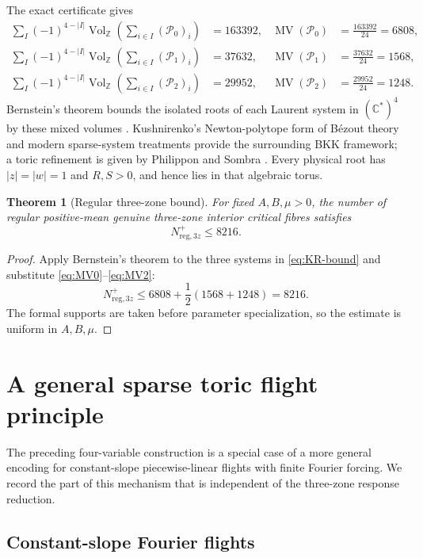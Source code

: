 \documentclass[11pt]{article}
\newtheorem{theorem}{Theorem}[section]
\newcommand{\CC}{\mathbb C}
\newcommand{\MV}{\operatorname{MV}}
\begin{document}
The exact certificate gives
\begin{align}
 \sum_I(-1)^{4-|I|}\operatorname{Vol}_{\mathbb Z}
 \left(\sum_{i\in I}(\mathcal P_0)_i\right)&=163392,
 &\MV(\mathcal P_0)&=\frac{163392}{24}=6808,\label{eq:MV0}\\
 \sum_I(-1)^{4-|I|}\operatorname{Vol}_{\mathbb Z}
 \left(\sum_{i\in I}(\mathcal P_1)_i\right)&=37632,
 &\MV(\mathcal P_1)&=\frac{37632}{24}=1568,\label{eq:MV1}\\
 \sum_I(-1)^{4-|I|}\operatorname{Vol}_{\mathbb Z}
 \left(\sum_{i\in I}(\mathcal P_2)_i\right)&=29952,
 &\MV(\mathcal P_2)&=\frac{29952}{24}=1248.\label{eq:MV2}
\end{align}
Bernstein's theorem bounds the isolated roots of each Laurent system in $(\CC^*)^4$ by these mixed volumes \cite{Bernstein1975}.  Kushnirenko's Newton-polytope form of B\'ezout theory \cite{Kushnirenko1976} and modern sparse-system treatments \cite{Sturmfels2002} provide the surrounding BKK framework; a toric refinement is given by Philippon and Sombra \cite{PhilipponSombra2008}.  Every physical root has $|z|=|w|=1$ and $R,S>0$, and hence lies in that algebraic torus.

\begin{theorem}[Regular three-zone bound]\label{thm:8216}
For fixed $A,B,\mu>0$, the number of regular positive-mean genuine three-zone interior critical fibres satisfies
\[
 \boxed{N_{\mathrm{reg},3z}^{+}\le8216}.
\]
\end{theorem}

\begin{proof}
Apply Bernstein's theorem to the three systems in \eqref{eq:KR-bound} and substitute \eqref{eq:MV0}--\eqref{eq:MV2}:
\[
 N_{\mathrm{reg},3z}^{+}
 \le6808+\frac12(1568+1248)=8216.
\]
The formal supports are taken before parameter specialization, so the estimate is uniform in $A,B,\mu$.
\end{proof}

\section{A general sparse toric flight principle}\label{sec:general-toric}

The preceding four-variable construction is a special case of a more general encoding for constant-slope piecewise-linear flights with finite Fourier forcing.  We record the part of this mechanism that is independent of the three-zone response reduction.

\subsection{Constant-slope Fourier flights}
\end{document}
